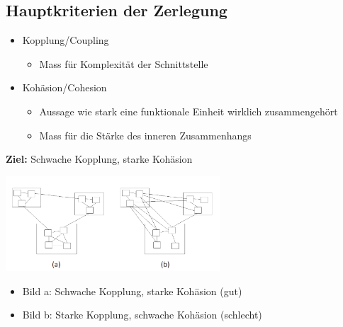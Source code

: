 \subsection{Hauptkriterien der Zerlegung}
\begin{itemize}
  \item Kopplung/Coupling
  \begin{itemize}
    \item Mass für Komplexität der Schnittstelle
  \end{itemize}
  \item Kohäsion/Cohesion
  \begin{itemize}
    \item Aussage wie stark eine funktionale Einheit wirklich zusammengehört
    \item Mass für die Stärke des inneren Zusammenhangs 
  \end{itemize}
\end{itemize}

\textbf{Ziel:} Schwache Kopplung, starke Kohäsion 

\begin{minipage}{9cm}
  \includegraphics[width=8cm]{images/Modularisierung/BeispieleKopplungKohaesion.png}
\end{minipage}
\begin{minipage}{8cm}
  \begin{itemize}
    \item Bild a: Schwache Kopplung, starke Kohäsion (gut)
    \item Bild b: Starke Kopplung, schwache Kohäsion (schlecht)
  \end{itemize}
\end{minipage}

